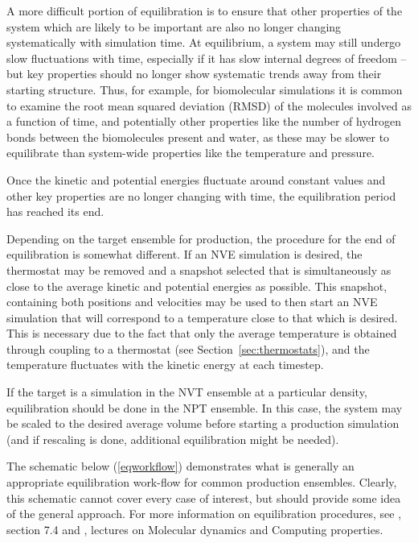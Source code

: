 \documentclass[9pt,bestpractices]{livecoms}
\begin{document}
A more difficult portion of equilibration is to ensure that other properties of the system which are likely to be important are also no longer changing systematically with simulation time.
At equilibrium, a system may still undergo slow fluctuations with time, especially if it has slow internal degrees of freedom -- but key properties should no longer show systematic trends away from their starting structure.
Thus, for example, for biomolecular simulations it is common to examine the root mean squared deviation (RMSD) of the molecules involved as a function of time, and potentially other properties like the number of hydrogen bonds between the biomolecules present and water, as these may be slower to equilibrate than system-wide properties like the temperature and pressure.

Once the kinetic and potential energies fluctuate around constant values and other key properties are no longer changing with time, the equilibration period has reached its end.

Depending on the target ensemble for production, the procedure for the end of equilibration is somewhat different.
If an NVE simulation is desired, the thermostat may be removed and a snapshot selected that is simultaneously as close to the average kinetic and potential energies as possible.
This snapshot, containing both positions and velocities may be used to then start an NVE simulation that will correspond to a temperature close to that which is desired.
This is necessary due to the fact that only the average temperature is obtained through coupling to a thermostat (see Section~\ref{sec:thermostats}), and the temperature fluctuates with the kinetic energy at each timestep.

If the target is a simulation in the NVT ensemble at a particular density, equilibration should be done in the NPT ensemble.
In this case, the system may be scaled to the desired average volume before starting a production simulation (and if rescaling is done, additional equilibration might be needed).

The schematic below (\ref{eqworkflow}) demonstrates what is generally an appropriate equilibration work-flow for common production ensembles.
Clearly, this schematic cannot cover every case of interest, but should provide some idea of the general approach.
For more information on equilibration procedures, see \citet{LeachBook}, section 7.4 and \citet{ShellNotes}, lectures on Molecular dynamics and Computing properties.
\end{document}

